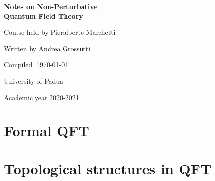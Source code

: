 \documentclass[a4paper]{report}
\newcommand{\onlyinsubfile}[1]{#1}
\newcommand{\onlyinmainfile}[1]{

\skipline

\textsf{\color{red} Part of the text is omitted from the compiled subfile, in order to make the compilation faster. You can find it in the main file. To avoid this, remove `` \textnormal{\textbackslash onlyinmainfile\{\ldots\}}'' from the code.}

\skipline

}
\begin{document}
\renewcommand{\onlyinsubfile}[1]{}
\renewcommand{\onlyinmainfile}[1]{#1}

\begin{titlepage}
\begin{center}
       \vspace*{5cm}
       \textbf{\Huge Notes on Non-Perturbative\\[0.3em]
       Quantum Field Theory}
       
       \vspace{1cm}
        {\LARGE Course held by Pieralberto Marchetti}
        
        \vspace{1.5cm}
        {\Large Written by Andrea Grossutti}   
                 
       \vfill
       {\large Compiled: \today} 
           
       \vspace{2cm}        
       {\large University of Padua}  
        
       \vspace{0.8cm}
       {\large Academic year 2020-2021}
\end{center}
\end{titlepage}

\tableofcontents

\part{Formal QFT}





\part{Topological structures in QFT}



\nocite{*}
\printbibliography
\end{document}
